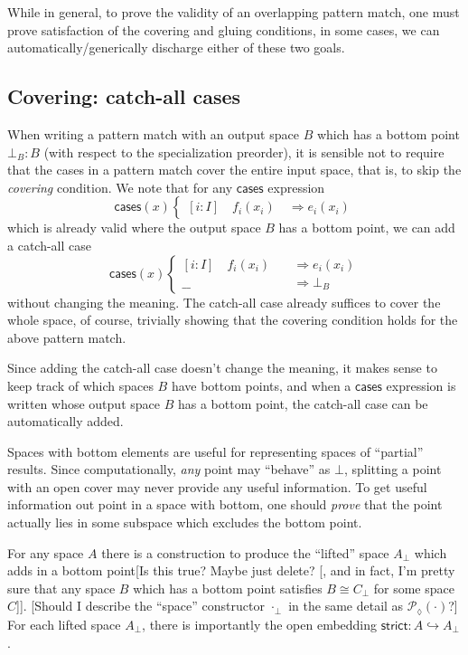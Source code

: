 \documentclass[conference]{IEEEtran}
\newcommand{\PLower}{\mathcal{P}_\lozenge}
\newcommand{\hookto}{\hookrightarrow}
\newcommand{\Branch}{\Rightarrow}
\begin{document}
While in general, to prove the validity of an overlapping pattern match, one must prove satisfaction of the covering and gluing conditions, in some cases, we can automatically/generically discharge either of these two goals. 

\subsection{Covering: catch-all cases}

When writing a pattern match with an output space $B$ which has a bottom point $\bot_B : B$ (with respect to the specialization preorder), it is sensible not to require that the cases in a pattern match cover the entire input space, that is, to skip the \emph{covering} condition. We note that for any $\mathsf{cases}$ expression
\[
\mathsf{cases}(x)
\begin{cases}
[i : I] \quad f_i(x_i) \quad \Branch e_i(x_i)
\end{cases}
\]
which is already valid where the output space $B$ has a bottom point, we can add a catch-all case
\[
\mathsf{cases}(x)
\begin{cases}
[i : I] \quad f_i(x_i) \quad &\Branch e_i(x_i)
\\ \_\_ \quad &\Branch \bot_B
\end{cases}
\]
without changing the meaning. The catch-all case already suffices to cover the whole space, of course, trivially showing that the covering condition holds for the above pattern match.

Since adding the catch-all case doesn't change the meaning, it makes sense to keep track of which spaces $B$ have bottom points, and when a $\mathsf{cases}$ expression is written whose output space $B$ has a bottom point, the catch-all case can be automatically added.

Spaces with bottom elements are useful for representing spaces of ``partial'' results. Since computationally, \emph{any} point may ``behave'' as $\bot$, splitting a point with an open cover may never provide any useful information. To get useful information out point in a space with bottom, one should \emph{prove} that the point actually lies in some subspace which excludes the bottom point.

For any space $A$ there is a construction to produce the ``lifted'' space $A_\bot$ which adds in a bottom point[Is this true? Maybe just delete? [, and in fact, I'm pretty sure that any space $B$ which has a bottom point satisfies $B \cong C_\bot$ for some space $C$]]. [Should I describe the ``space'' constructor $\cdot_\bot$ in the same detail as $\PLower(\cdot)$?] For each lifted space $A_\bot$, there is importantly the open embedding $\mathsf{strict} : A \hookto A_\bot$.
\end{document}
